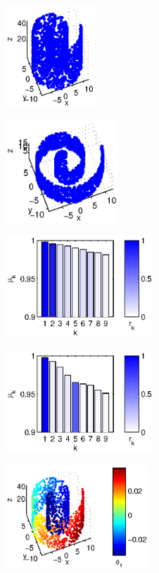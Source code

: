 \documentclass[preprint]{elsarticle}
\begin{document}
\begin{figure}
%
\begin{subfigure}{0.45\textwidth}
\centering
\includegraphics[height=1.5in]{swissroll1}
\caption{}
\end{subfigure}
\hfill
\begin{subfigure}{0.45\textwidth}
\centering
\includegraphics[height=1.5in]{swissroll2}
\caption{}
\end{subfigure}
\hfill
\begin{subfigure}{0.45\textwidth}
\centering
\includegraphics[height=1.5in]{swissroll1_evals}
\caption{}
\end{subfigure}
\hfill
\begin{subfigure}{0.45\textwidth}
\centering
\includegraphics[height=1.5in]{swissroll2_evals}
\caption{}
\end{subfigure}
\hfill
\begin{subfigure}{0.45\textwidth}
\centering
\includegraphics[height=1.5in]{swissroll1_color1} 

\end{subfigure}
\end{figure}
\end{document}
